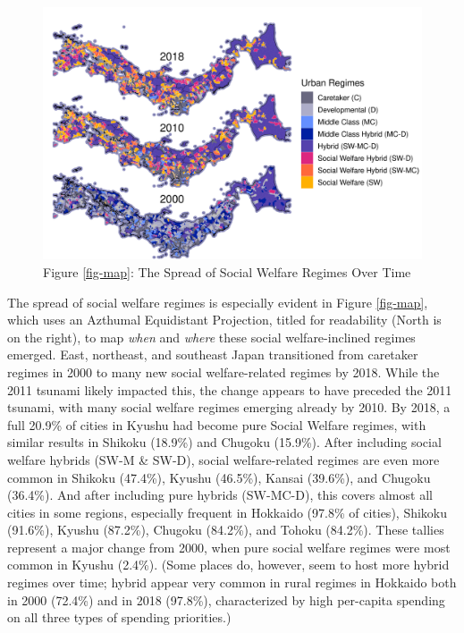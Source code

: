 \documentclass[preprint, 3p,
authoryear]{elsarticle} %
\begin{document}
\begin{figure}
\includegraphics[width=1\linewidth]{viz/map_categories_3} \caption{Figure \ref{fig-map}\label{fig-map}: The Spread of Social Welfare Regimes Over Time}\label{fig:map}
\end{figure}

The spread of social welfare regimes is especially evident in Figure
\ref{fig-map}, which uses an Azthumal Equidistant Projection, titled for
readability (North is on the right), to map \emph{when} and \emph{where}
these social welfare-inclined regimes emerged. East, northeast, and
southeast Japan transitioned from caretaker regimes in 2000 to many new
social welfare-related regimes by 2018. While the 2011 tsunami likely
impacted this, the change appears to have preceded the 2011 tsunami,
with many social welfare regimes emerging already by 2010. By 2018, a
full 20.9\% of cities in Kyushu had become pure Social Welfare regimes,
with similar results in Shikoku (18.9\%) and Chugoku (15.9\%). After
including social welfare hybrids (SW-M \& SW-D), social welfare-related
regimes are even more common in Shikoku (47.4\%), Kyushu (46.5\%),
Kansai (39.6\%), and Chugoku (36.4\%). And after including pure hybrids
(SW-MC-D), this covers almost all cities in some regions, especially
frequent in Hokkaido (97.8\% of cities), Shikoku (91.6\%), Kyushu
(87.2\%), Chugoku (84.2\%), and Tohoku (84.2\%). These tallies represent
a major change from 2000, when pure social welfare regimes were most
common in Kyushu (2.4\%). (Some places do, however, seem to host more
hybrid regimes over time; hybrid appear very common in rural regimes in
Hokkaido both in 2000 (72.4\%) and in 2018 (97.8\%), characterized by
high per-capita spending on all three types of spending priorities.)
\end{document}
